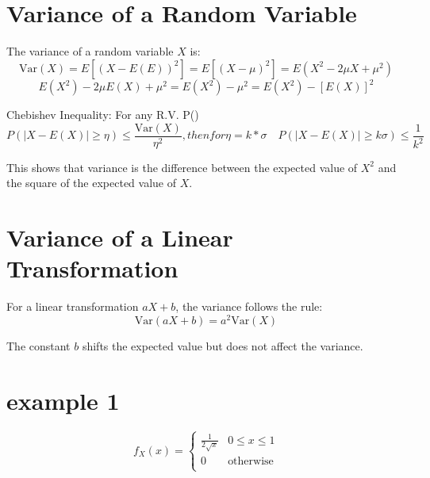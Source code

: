 
\section{Variance of a Random Variable}
The variance of a random variable \( X \) is:
\[
\text{Var}(X) = E[(X - E(E))^2] = E[(X - \mu)^2] = E(X^2 - 2\mu X + \mu^2) 
\]
\[
E(X^2) - 2\mu E(X) + \mu^2 = E(X^2) - \mu^2  = E(X^2) - [E(X)]^2
\]

Chebishev Inequality: 
For any R.V. P()
\[
P(|X - E(X)| \geq \eta) \leq \frac{\text{Var}(X)}{\eta^2}, then for \eta = k * \sigma \quad P(|X - E(X)| \geq k\sigma) \leq \frac{1}{k^2}
\]

This shows that variance is the difference between the expected value of \( X^2 \) and the square of the expected value of \( X \).

\section{Variance of a Linear Transformation}
For a linear transformation \( aX + b \), the variance follows the rule:
\[
\text{Var}(aX + b) = a^2 \text{Var}(X)
\]

The constant \( b \) shifts the expected value but does not affect the variance.

\section{example 1}
\[
f_X(x) =
\begin{cases} 
\frac{1}{2\sqrt{x}} & 0 \leq x \leq 1 \\
0 & \text{otherwise} \\
\end{cases}
\]


